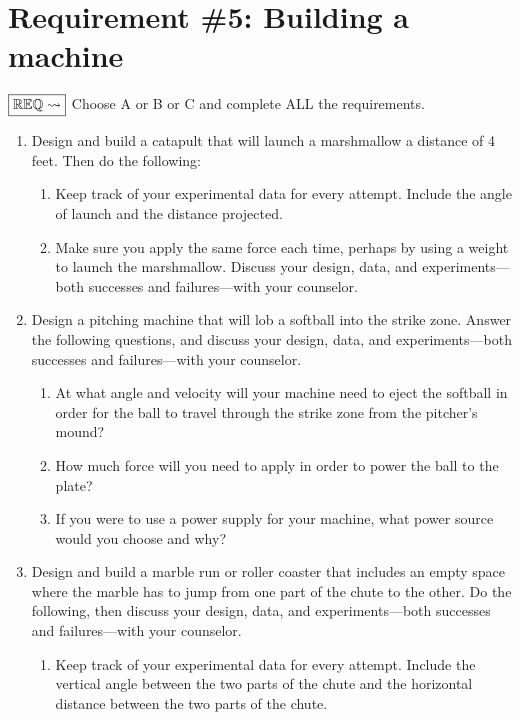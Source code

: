 \documentclass[letterpaper,10pt,english,openany,oneside]{sphinxmanual}
\begin{document}
\chapter{Requirement \#5: Building a machine}
\label{\detokenize{requirement5:requirement-5-building-a-machine}}\label{\detokenize{requirement5::doc}}
\(\boxed{\mathbb{REQ}\Large \rightsquigarrow}\) Choose A or B or C and complete ALL the requirements.
\begin{enumerate}
%
\item {} 
Design and build a catapult that will launch a marshmallow a distance of 4 feet. Then do the following:
\begin{enumerate}
%
\item {} 
Keep track of your experimental data for every attempt. Include the angle of launch and the distance projected.

\item {} 
Make sure you apply the same force each time, perhaps by using a weight to launch the marshmallow. Discuss your design, data, and experiments—both successes and failures—with your counselor.

\end{enumerate}

\item {} 
Design a pitching machine that will lob a softball into the strike zone. Answer the following questions, and discuss your design, data, and experiments—both successes and failures—with your counselor.
\begin{enumerate}
%
\item {} 
At what angle and velocity will your machine need to eject the softball in order for the ball to travel through the strike zone from the pitcher’s mound?

\item {} 
How much force will you need to apply in order to power the ball to the plate?

\item {} 
If you were to use a power supply for your machine, what power source would you choose and why?

\end{enumerate}

\item {} 
Design and build a marble run or roller coaster that includes an empty space where the marble has to jump from one part of the chute to the other. Do the following, then discuss your design, data, and experiments—both successes and failures—with your counselor.
\begin{enumerate}
%
\item {} 
Keep track of your experimental data for every attempt. Include the vertical angle between the two parts of the chute and the horizontal distance between the two parts of the chute.


\end{enumerate}
\end{enumerate}
\end{document}
